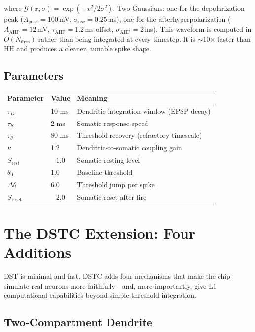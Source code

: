 \documentclass[12pt]{article}
\begin{document}
\noindent where $\mathcal{G}(x, \sigma) = \exp(-x^2 / 2\sigma^2)$. Two Gaussians: one for the depolarization peak ($A_{\text{peak}} = 100$\,mV, $\sigma_{\text{rise}} = 0.25$\,ms), one for the afterhyperpolarization ($A_{\text{AHP}} = 12$\,mV, $\tau_{\text{AHP}} = 1.2$\,ms offset, $\sigma_{\text{AHP}} = 2$\,ms). This waveform is computed in $O(N_{\text{fires}})$ rather than being integrated at every timestep. It is $\sim$10$\times$ faster than HH and produces a cleaner, tunable spike shape.

\subsection{Parameters}

\begin{center}
\small
\begin{tabular}{lll}
\toprule
\textbf{Parameter} & \textbf{Value} & \textbf{Meaning} \\
\midrule
$\tau_D$    & 10 ms  & Dendritic integration window (EPSP decay) \\
$\tau_S$    &  2 ms  & Somatic response speed \\
$\tau_\theta$ & 80 ms & Threshold recovery (refractory timescale) \\
$\kappa$    &  1.2   & Dendritic-to-somatic coupling gain \\
$S_{\text{rest}}$ & $-1.0$ & Somatic resting level \\
$\theta_0$  &  1.0   & Baseline threshold \\
$\Delta\theta$ & 6.0 & Threshold jump per spike \\
$S_{\text{reset}}$ & $-2.0$ & Somatic reset after fire \\
\bottomrule
\end{tabular}
\end{center}

\section{The DSTC Extension: Four Additions}
\label{sec:dstc}

DST is minimal and fast. DSTC adds four mechanisms that make the chip simulate real neurons more faithfully---and, more importantly, give L1 computational capabilities beyond simple threshold integration.

\subsection{Two-Compartment Dendrite}
\end{document}
